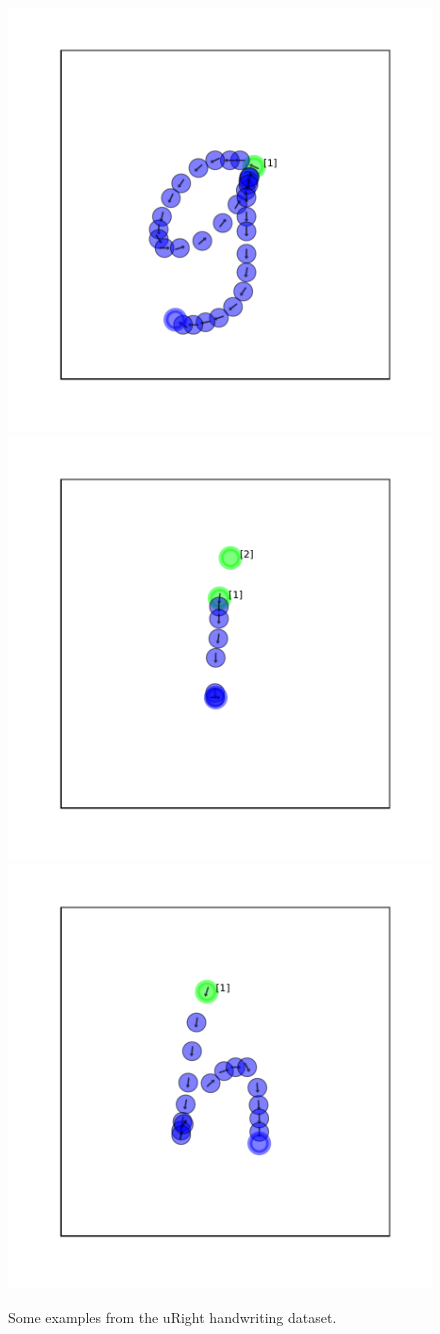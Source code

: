 \documentclass{article}
\begin{document}
\begin{figure}[htb]
\vskip 0.2in
\begin{center}
\centering
  \includegraphics[width=.3\linewidth]{figures/icml-uright-examples-0.pdf}
  \includegraphics[width=.3\linewidth]{figures/icml-uright-examples-1.pdf}
  \includegraphics[width=.3\linewidth]{figures/icml-uright-examples-2.pdf}\\
  \caption{Some examples from the uRight handwriting dataset.}
  \label{fig:uright-examples}
\end{center}
\vskip -0.2in
\end{figure}
\end{document}
